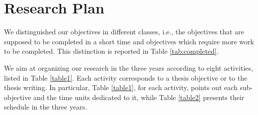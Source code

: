 \section{Research Plan}\label{researchplan}
We distinguished our objectives in different classes, i.e., the objectives that are supposed to be completed in a short time and objectives which require more work to be completed. This distinction is reported in Table \ref{tab:completed}.

We aim at organizing our research in the three years according to eight activities, listed in Table \ref{table1}. Each activity corresponds to a thesis objective or to the thesis writing. In particular, Table \ref{table1}, for each activity, points out each sub-objective and the time units dedicated to it, while Table \ref{table2} presents their schedule in the three years.






